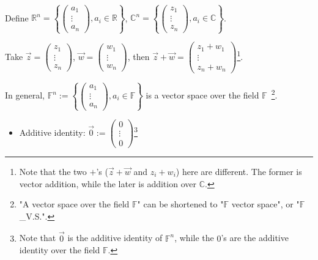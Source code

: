 \documentclass[11pt,fleqn]{book} %
\begin{document}
\begin{example}
{~~~}

    Define $\mathbb{R}^n = \left\{ \begin{pmatrix} a_1\\\vdots\\a_n \end{pmatrix}, a_i \in \mathbb{R} \right\}$, 
    $\mathbb{C}^n = \left\{ \begin{pmatrix} z_1\\\vdots\\z_n \end{pmatrix}, a_i \in \mathbb{C} \right\}$. 
    
    Take $\overrightarrow{z} = \begin{pmatrix} z_1 \\ \vdots \\ z_n \end{pmatrix}$, $\overrightarrow{w} = \begin{pmatrix} w_1 \\ \vdots \\ w_n \end{pmatrix}$, then $\overrightarrow{z} + \overrightarrow{w} = \begin{pmatrix} z_1 + w_1 \\ \vdots \\ z_n + w_n \end{pmatrix}$\footnote{Note that the two $+$'s ($\overrightarrow{z} + \overrightarrow{w}$ and $z_i + w_i$) here are different. The former is vector addition, while the later is addition over $\mathbb{C}$. }.
    
    In general, $\mathbb{F}^n := \left\{ \begin{pmatrix} a_1 \\ \vdots \\ a_n \end{pmatrix}, a_i \in \mathbb{F} \right\}$ is a vector space over the field $\mathbb{F}$~\footnote{"A vector space over the field $\mathbb{F}$" can be shortened to "$\mathbb{F}$ vector space", or "$\mathbb{F}$\_V.S.". }. 
    
    \begin{itemize}
        \item Additive identity: $\overrightarrow{0} := \begin{pmatrix} 0 \\ \vdots \\ 0 \end{pmatrix}$\footnote{Note that $\overrightarrow{0}$ is the additive identity of $\mathbb{F}^n$, while the $0$’s are the additive identity over the field $\mathbb{F}$.}


\end{itemize}
\end{example}
\end{document}
